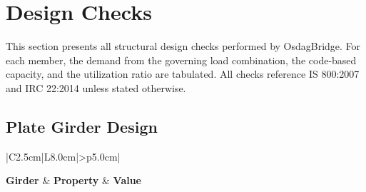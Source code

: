 \documentclass[12pt,a4paper]{report}
\numberwithin{table}{chapter}
\numberwithin{figure}{chapter}
\begin{document}
\chapter{Design Checks}

This section presents all structural design checks performed by OsdagBridge. For each member, the demand from the governing load combination, the code-based capacity, and the utilization ratio are tabulated. All checks reference IS 800:2007 and IRC 22:2014 unless stated otherwise.

\section{Plate Girder Design}
\label{sec:plate-girder}

\vspace{1em}
\begin{longtable}{|C{2.5cm}|L{8.0cm}|>{\centering\arraybackslash}p{5.0cm}|}
\caption{\textbf{Girder Section Properties (Final Optimized / User-selected)}}
\hline
\textbf{Girder} & \textbf{Property} & \textbf{Value} \\[6pt]
\hline
\endfirsthead


\end{longtable}
\end{document}
